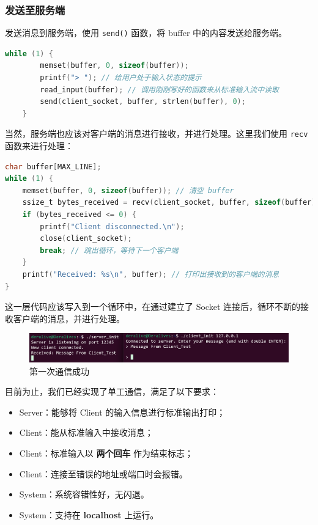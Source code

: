 \documentclass[14pt,a4paper,UTF8,twoside]{article}
\begin{document}
\subsubsection*{发送至服务端}

发送消息到服务端，使用 \texttt{send()} 函数，将 buffer 中的内容发送给服务端。

\begin{lstlisting}[language=C, title={Send Message}]
    while (1) {
        memset(buffer, 0, sizeof(buffer));
        printf("> "); // 给用户处于输入状态的提示
        read_input(buffer); // 调用刚刚写好的函数来从标准输入流中读取
        send(client_socket, buffer, strlen(buffer), 0);
    }
\end{lstlisting}

当然，服务端也应该对客户端的消息进行接收，并进行处理。这里我们使用 \texttt{recv{}} 函数来进行处理：

\begin{lstlisting}[language=C, title={Receive Message}]
char buffer[MAX_LINE];
while (1) {
    memset(buffer, 0, sizeof(buffer)); // 清空 buffer
    ssize_t bytes_received = recv(client_socket, buffer, sizeof(buffer) - 1, 0);
    if (bytes_received <= 0) {
        printf("Client disconnected.\n");
        close(client_socket);
        break; // 跳出循环，等待下一个客户端
    }
    printf("Received: %s\n", buffer); // 打印出接收到的客户端的消息
}
\end{lstlisting}

这一层代码应该写入到一个循环中，在通过建立了 Socket 连接后，循环不断的接收客户端的消息，并进行处理。

\begin{figure}[H]
    \centering
    \includegraphics[width=0.9\linewidth]{lab7/init.png}
    \caption{第一次通信成功}
    \label{fig:socket}
\end{figure}

目前为止，我们已经实现了单工通信，满足了以下要求：

\begin{rmr}
    \begin{itemize}
        \item Server：能够将 Client 的输入信息进行标准输出打印；
        \item Client：能从标准输入中接收消息；
        \item Client：标准输入以 \textbf{两个回车} 作为结束标志；
        \item Client：连接至错误的地址或端口时会报错。
        \item System：系统容错性好，无闪退。
        \item System：支持在 \textbf{localhost} 上运行。
    \end{itemize}
\end{rmr}
\end{document}
